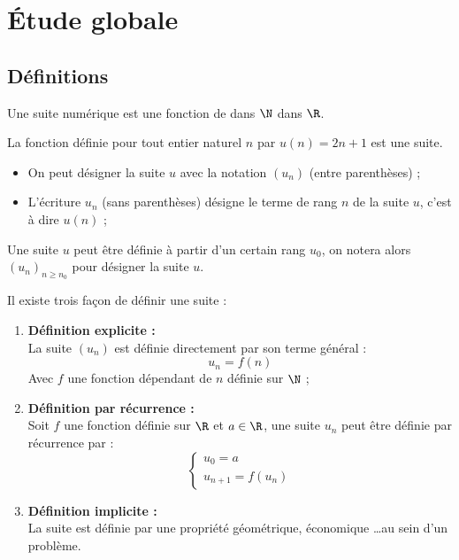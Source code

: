 \documentclass[11pt]{article}
\begin{document}
\section{Étude globale}

\subsection{Définitions}

\begin{definition}
Une suite numérique est une fonction de dans $\N$ dans $\R$.
\end{definition}

\begin{exemple}
La fonction définie pour tout entier naturel $n$ par $u(n)=2n+1$ est une suite.
\end{exemple}

\begin{notation}
\vspace{-0.5cm}
\begin{itemize}
\item On peut désigner la suite $u$ avec la notation $(u_n)$ (entre
parenthèses) ;
\item L'écriture $u_n$ (sans parenthèses) désigne le terme de rang $n$
de la suite $u$, c'est à dire $u(n)$ ;
\end{itemize}
\end{notation}

\begin{remarque}
Une suite $u$ peut être définie à partir d'un certain rang $u_0$, on
notera alors $(u_n)_{n \ge n_0}$ pour désigner la suite $u$. 
\end{remarque}

\begin{definition}
Il existe trois façon de définir une suite :
\begin{enumerate}
\item \textbf{Définition explicite :} \\
La suite $(u_n)$ est définie
directement par son terme général :
$$ u_n=f(n) $$
Avec $f$ une fonction dépendant de
$n$ définie sur $\N$ ; 
\item \textbf{Définition par récurrence :} \\
Soit $f$ une fonction définie sur
$\R$ et $a \in \R$, une suite $u_n$
peut être définie par récurrence par :
$$\begin{cases}
u_0 = a \\
u_{n+1} = f(u_n)
\end{cases}$$
\item \textbf{Définition implicite :} \\
La suite est définie par une
propriété géométrique, économique \dots au sein d'un
problème.
\end{enumerate}
\end{definition}
\end{document}
